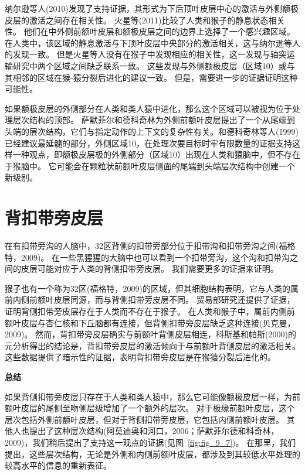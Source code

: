 纳尔逊等人(2010)发现了支持证据，其形式为下后顶叶皮层中心的激活与外侧额极皮层的激活之间存在相关性。
火星等(2011)比较了人类和猴子的静息状态相关性。
他们在中外侧前额叶皮层和额极皮层之间的边界上选择了一个感兴趣区域。
在人类中，该区域的静息激活与下顶叶皮层中央部分的激活相关，这与纳尔逊等人的发现一致。
但是火星等人没有在猴子中发现相应的相关性，这一发现与轴突运输研究中两个区域之间缺乏联系一致。
这些发现与外侧额极皮层（区域10）或与其相邻的区域在猴-猿分裂后进化的建议一致。
但是，需要进一步的证据证明这种可能性。
\par


如果额极皮层的外侧部分在人类和类人猿中进化，那么这个区域可以被视为位于处理层次结构的顶部。
萨默菲尔和德科奇林为外侧前额叶皮层提出了一个从尾端到头端的层次结构，它们与指定动作的上下文的复杂性有关。和德科奇林等人(1999)已经建议最延髓的部分，外侧区域10，在处理次要目标时牢有限数量的证据支持这样一种观点，即额极皮层极的外侧部分（区域10）出现在人类和猿脑中，但不存在于猴脑中。
它可能会在颗粒状前额叶皮层侧面的尾端到头端层次结构中创建一个新级别。



\section{背扣带旁皮层}

在有扣带旁沟的人脑中，32区背侧的扣带旁部分位于扣带沟和扣带旁沟之间(福格特，2009)。
在一些黑猩猩的大脑中也可以看到一个扣带旁沟，这个沟和扣带沟之间的皮层可能对应于人类的背侧扣带旁皮层。
我们需要更多的证据来证明。
\par


猴子也有一个称为32区(福格特，2009)的区域，但其细胞结构表明，它与人类的属前内侧前额叶皮层同源，而与背侧扣带旁皮层不同。
贸易部研究还提供了证据，证明背侧扣带旁皮层存在于人类而不存在于猴子。
在人类和猴子中，属前内侧前额叶皮层与杏仁核和下丘脑都有连接，但背侧扣带旁皮层缺乏这种连接(贝克曼，2009)。
然而，背扣带旁皮层确实与前额叶背侧皮层相连，科斯基和帕斯(2000)的元分析得出的结论是，背扣带旁皮层的激活倾向于与前额叶背侧皮层的激活相关。
这些数据提供了暗示性的证据，表明背扣带旁皮层是在猴猿分裂后进化的。



\textbf{总结}
\par

如果背侧扣带旁皮层只存在于人类和类人猿中，那么它可能像额极皮层一样，为前额叶皮层的尾侧至吻侧层级增加了一个额外的层次。
对于极缘前额叶皮层，这个层次包括外侧前额叶皮层，但对于背侧扣带旁皮层，它包括内侧前额叶皮层。
其他人也提出了这种层次结构(阿莫迪奥和河口，2006；萨默菲尔德和科奇林，2009)，我们稍后提出了支持这一观点的证据(见图~\ref{fig:fig_9_7})。
在那里，我们提出，这些层次结构，无论是外侧和内侧前额叶皮层，都涉及到其较低水平处理的较高水平的信息的重新表征。
\par


